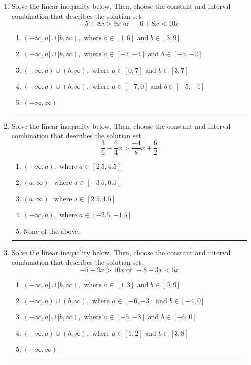 \documentclass[14pt]{extbook}
\newcommand{\litem}[1]{\item#1\hspace*{-1cm}\rule{\textwidth}{0.4pt}}
\begin{document}
\begin{enumerate}
{\begin{enumerate}[label=\Alph*.]
\end{enumerate} }
\litem{
Solve the linear inequality below. Then, choose the constant and interval combination that describes the solution set.\[ -5 + 8 x > 9 x \text{ or } -6 + 8 x < 10 x \]\begin{enumerate}[label=\Alph*.]
\item \( (-\infty, a] \cup [b, \infty), \text{ where } a \in [1, 6] \text{ and } b \in [3, 9] \)
\item \( (-\infty, a] \cup [b, \infty), \text{ where } a \in [-7, -4] \text{ and } b \in [-5, -2] \)
\item \( (-\infty, a) \cup (b, \infty), \text{ where } a \in [0, 7] \text{ and } b \in [3, 7] \)
\item \( (-\infty, a) \cup (b, \infty), \text{ where } a \in [-7, 0] \text{ and } b \in [-5, -1] \)
\item \( (-\infty, \infty) \)

\end{enumerate} }
\litem{
Solve the linear inequality below. Then, choose the constant and interval combination that describes the solution set.\[ \frac{3}{6} - \frac{6}{4} x > \frac{-4}{8} x + \frac{6}{2} \]\begin{enumerate}[label=\Alph*.]
\item \( (-\infty, a), \text{ where } a \in [2.5, 4.5] \)
\item \( (a, \infty), \text{ where } a \in [-3.5, 0.5] \)
\item \( (a, \infty), \text{ where } a \in [2.5, 4.5] \)
\item \( (-\infty, a), \text{ where } a \in [-2.5, -1.5] \)
\item \( \text{None of the above}. \)

\end{enumerate} }
\litem{
Solve the linear inequality below. Then, choose the constant and interval combination that describes the solution set.\[ -5 + 9 x > 10 x \text{ or } -8 - 3 x < 5 x \]\begin{enumerate}[label=\Alph*.]
\item \( (-\infty, a] \cup [b, \infty), \text{ where } a \in [1, 3] \text{ and } b \in [0, 9] \)
\item \( (-\infty, a) \cup (b, \infty), \text{ where } a \in [-6, -3] \text{ and } b \in [-4, 0] \)
\item \( (-\infty, a] \cup [b, \infty), \text{ where } a \in [-5, -3] \text{ and } b \in [-6, 0] \)
\item \( (-\infty, a) \cup (b, \infty), \text{ where } a \in [1, 2] \text{ and } b \in [3, 8] \)
\item \( (-\infty, \infty) \)


\end{enumerate}}
\end{enumerate}
\end{document}
